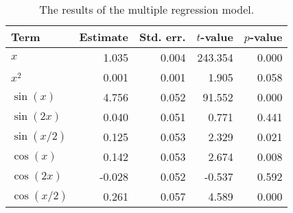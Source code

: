 \begin{table}[t]

\caption{\label{tab:multiple-regression}The results of the multiple regression model.}
\centering
\begin{tabular}{lrrrr}
\toprule
Term & Estimate & Std. err. & \(t\)-value & \(p\)-value\\
\midrule
\(x\) & 1.035 & 0.004 & 243.354 & 0.000\\
\(x^2\) & 0.001 & 0.001 & 1.905 & 0.058\\
\(\sin(x)\) & 4.756 & 0.052 & 91.552 & 0.000\\
\(\sin(2x)\) & 0.040 & 0.051 & 0.771 & 0.441\\
\(\sin(x/2)\) & 0.125 & 0.053 & 2.329 & 0.021\\
\(\cos(x)\) & 0.142 & 0.053 & 2.674 & 0.008\\
\(\cos(2x)\) & -0.028 & 0.052 & -0.537 & 0.592\\
\(\cos(x/2)\) & 0.261 & 0.057 & 4.589 & 0.000\\
\bottomrule
\end{tabular}
\end{table}